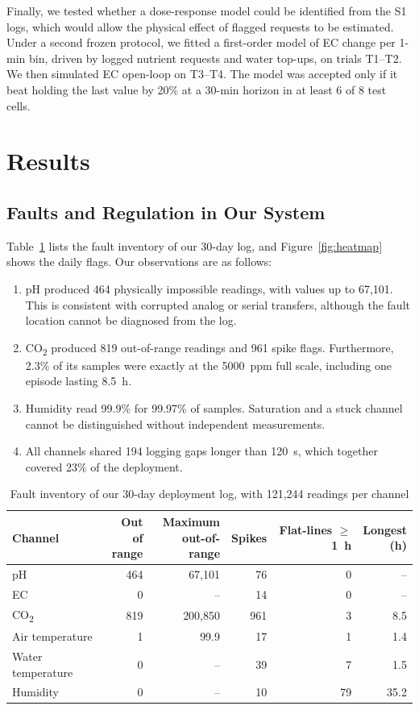 \documentclass[preprint,12pt,doubleblind]{elsarticle}
\newcommand{\COtwo}{CO\textsubscript{2}}
\begin{document}
Finally, we tested whether a dose-response model could be identified from the S1 logs, which would allow the physical effect of flagged requests to be estimated. Under a second frozen protocol, we fitted a first-order model of EC change per 1-min bin, driven by logged nutrient requests and water top-ups, on trials T1--T2. We then simulated EC open-loop on T3--T4. The model was accepted only if it beat holding the last value by 20\% at a 30-min horizon in at least 6 of 8 test cells.

\section{Results}
\label{sec:results}
\subsection{Faults and Regulation in Our System}
Table~\ref{tab:inventory} lists the fault inventory of our 30-day log, and Figure~\ref{fig:heatmap} shows the daily flags. Our observations are as follows:
\begin{enumerate}
\item pH produced 464 physically impossible readings, with values up to 67,101. This is consistent with corrupted analog or serial transfers, although the fault location cannot be diagnosed from the log.
\item \COtwo{} produced 819 out-of-range readings and 961 spike flags. Furthermore, 2.3\% of its samples were exactly at the 5000~ppm full scale, including one episode lasting 8.5~h.
\item Humidity read 99.9\% for 99.97\% of samples. Saturation and a stuck channel cannot be distinguished without independent measurements.
\item All channels shared 194 logging gaps longer than 120~s, which together covered 23\% of the deployment.
\end{enumerate}

\begin{table}[!htbp]
\centering
\caption{Fault inventory of our 30-day deployment log, with 121,244 readings per channel}
\label{tab:inventory}
\small
\setlength{\tabcolsep}{4pt}
\begin{tabular}{lrrrrr}
\toprule
Channel & \shortstack{Out of\\range} & \shortstack{Maximum\\out-of-range} & Spikes & \shortstack{Flat-lines\\$\ge$1~h} & \shortstack{Longest\\(h)} \\
\midrule
pH & 464 & 67,101 & 76 & 0 & -- \\
EC & 0 & -- & 14 & 0 & -- \\
\COtwo & 819 & 200,850 & 961 & 3 & 8.5 \\
Air temperature & 1 & 99.9 & 17 & 1 & 1.4 \\
Water temperature & 0 & -- & 39 & 7 & 1.5 \\
Humidity & 0 & -- & 10 & 79 & 35.2 \\
\bottomrule
\end{tabular}
\end{table}
\end{document}
